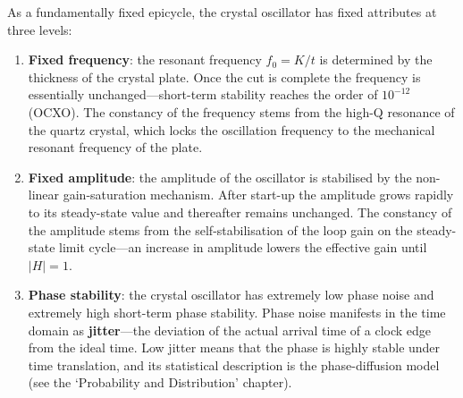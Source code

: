 \begin{proposition}\label{prop:quartz_three_fixed}
As a fundamentally fixed epicycle, the crystal oscillator has fixed attributes at three levels:
\begin{enumerate}[label=(\roman*)]
    \item \textbf{Fixed frequency}: the resonant frequency $f_0 = K/t$ is determined by the thickness of the crystal plate. Once the cut is complete the frequency is essentially unchanged---short-term stability reaches the order of $10^{-12}$ (OCXO). The constancy of the frequency stems from the high-Q resonance of the quartz crystal, which locks the oscillation frequency to the mechanical resonant frequency of the plate.
    \item \textbf{Fixed amplitude}: the amplitude of the oscillator is stabilised by the non-linear gain-saturation mechanism. After start-up the amplitude grows rapidly to its steady-state value and thereafter remains unchanged. The constancy of the amplitude stems from the self-stabilisation of the loop gain on the steady-state limit cycle---an increase in amplitude lowers the effective gain until $|H|=1$.
    \item \textbf{Phase stability}: the crystal oscillator has extremely low phase noise and extremely high short-term phase stability. Phase noise manifests in the time domain as \textbf{jitter}---the deviation of the actual arrival time of a clock edge from the ideal time. Low jitter means that the phase is highly stable under time translation, and its statistical description is the phase-diffusion model (see the `Probability and Distribution' chapter).
\end{enumerate}
\end{proposition}

